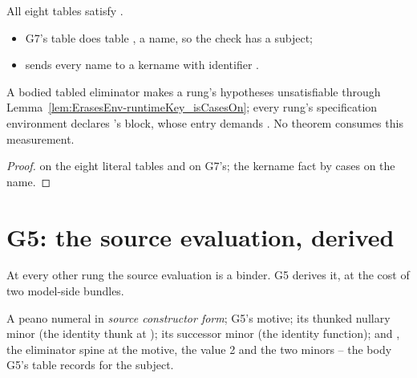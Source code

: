 \begin{lemma}\label{lem:Green-noTabledCasesOnBodies}
 \leanok
{}
 All eight tables satisfy .
\begin{itemize}
\item G7's table does table , a  name, so the check has a subject;
\item {} sends every  name to a kername with identifier .
\end{itemize}
 A bodied tabled eliminator makes a rung's hypotheses unsatisfiable through
Lemma~\ref{lem:ErasesEnv-runtimeKey_isCasesOn}; every rung's specification environment declares
's block, whose  entry demands . No theorem consumes
this measurement.
\end{lemma}

\begin{proof} \leanok
{}
  on the eight literal tables and on G7's; the kername fact by cases
on the name.
\end{proof}

\section{G5: the source evaluation, derived}
\label{sec:capstone:g5}

At every other rung the source evaluation is a binder. G5 derives it, at the cost of two model-side
bundles.

\begin{definition}\label{def:Green-peanoSrc}
 \leanok
{}
A peano numeral in \emph{source constructor form}; G5's motive; its thunked nullary minor (the
identity thunk at ); its successor minor (the identity function); and ,
the eliminator spine  at the motive, the value 2 and the two minors -- the body
G5's table records for the subject.
\end{definition}


